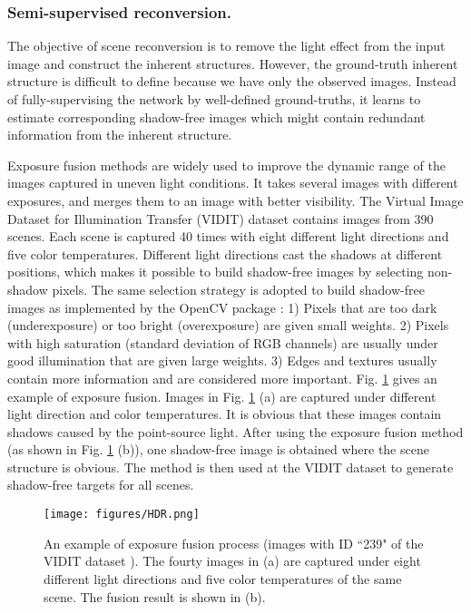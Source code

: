\documentclass[runningheads]{llncs}
\begin{document}
\vskip -0.5cm
\baselineskip 
\subsubsection{Semi-supervised reconversion.}

The objective of scene reconversion is to remove the light effect from the input image and construct the inherent structures. However, the ground-truth inherent structure is difficult to define because we have only the observed images. Instead of fully-supervising the network by well-defined ground-truths, it learns to estimate corresponding shadow-free images which might contain redundant information from the inherent structure. 

Exposure fusion methods \cite{HDR_opencvbase,Exposure_tom} are widely used to improve the dynamic range of the images captured in uneven light conditions. It takes several images with different exposures, and merges them to an image with better visibility. The Virtual Image Dataset for Illumination Transfer (VIDIT) dataset \cite{helou2020vidit} contains images from 390 scenes. Each scene is captured 40 times with eight different light directions and five color temperatures. Different light directions cast the shadows at different positions, which makes it possible to build shadow-free images by selecting non-shadow pixels. The same selection strategy \cite{Exposure_tom} is adopted to build shadow-free images as implemented by the OpenCV package \cite{opencv}: 1) Pixels that are too dark (underexposure) or too bright (overexposure) are given small weights. 2) Pixels with high saturation (standard deviation of RGB channels) are usually under good illumination that are given large weights. 3) Edges and textures usually contain more information and are considered more important. Fig. \ref{fig:HDR} gives an example of exposure fusion. Images in Fig. \ref{fig:HDR} (a) are captured under different light direction and color temperatures. It is obvious that these images contain shadows caused by the point-source light. After using the exposure fusion method (as shown in Fig. \ref{fig:HDR} (b)), one shadow-free image is obtained where the scene structure is obvious. The method is then used at the VIDIT dataset \cite{helou2020vidit} to generate shadow-free targets for all scenes.

\begin{figure}[t]
    \centering
    \texttt{[image: figures/HDR.png]}
   \baselineskip 
    \caption{An example of exposure fusion process (images with ID ``239" of the VIDIT dataset \cite{helou2020vidit}). The fourty images in (a) are captured under eight different light directions and five color temperatures of the same scene. The fusion result is shown in (b).
}
    \label{fig:HDR}
   \baselineskip 
\end{figure}
\end{document}
